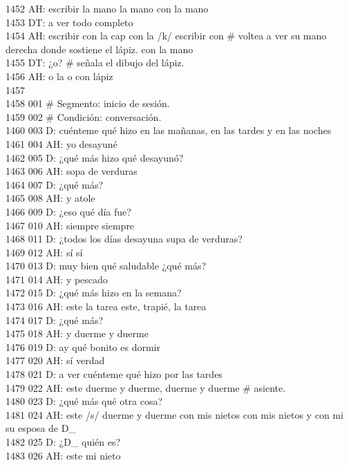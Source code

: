 1452 AH: escribir la mano la mano con la mano\\
1453 DT: a ver todo completo\\
1454 AH: escribir con la cap con la /k/ escribir con # voltea a ver su mano derecha donde sostiene el lápiz. con la mano\\
1455 DT: ¿o? # señala el dibujo del lápiz.\\
1456 AH: o la o con lápiz\\
1457 \\
1458 001 # Segmento: inicio de sesión.\\
1459 002 # Condición: conversación.\\
1460 003 D: cuénteme qué hizo en las mañanas, en las tardes y en las noches\\
1461 004 AH: yo desayuné\\
1462 005 D: ¿qué más hizo qué desayunó?\\
1463 006 AH: sopa de verduras\\
1464 007 D: ¿qué más?\\
1465 008 AH: y atole\\
1466 009 D: ¿eso qué día fue?\\
1467 010 AH: siempre siempre\\
1468 011 D: ¿todos los días desayuna supa de verduras?\\
1469 012 AH: sí sí\\
1470 013 D: muy bien qué saludable ¿qué más?\\
1471 014 AH: y pescado\\
1472 015 D: ¿qué más hizo en la semana?\\
1473 016 AH: este la tarea este, trapié, la tarea\\
1474 017 D: ¿qué más?\\
1475 018 AH: y duerme y duerme\\
1476 019 D: ay qué bonito es dormir\\
1477 020 AH: sí verdad\\
1478 021 D: a ver cuénteme qué hizo por las tardes\\
1479 022 AH: este duerme y duerme, duerme y duerme # asiente.\\
1480 023 D: ¿qué más qué otra cosa?\\
1481 024 AH: este /s/ duerme y duerme con mis nietos con mis nietos y con mi su esposa de D_\\
1482 025 D: ¿D_ quién es?\\
1483 026 AH: este mi nieto\\
